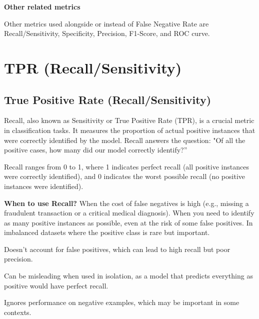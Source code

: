 \textbf{Other related metrics}

Other metrics used alongside or instead of False Negative Rate
are Recall/Sensitivity, Specificity, Precision, F1-Score, and ROC curve.

\clearpage
\section{TPR (Recall/Sensitivity)}
\subsection{True Positive Rate (Recall/Sensitivity)}
\thispagestyle{classificationstyle}

Recall, also known as Sensitivity or True Positive Rate (TPR), is a crucial metric in classification tasks. It measures the proportion of actual
positive instances that were correctly identified by the model. Recall answers the question: "Of all the positive cases, how many did our model correctly identify?”

\begin{center}
\end{center}

Recall ranges from 0 to 1, where 1 indicates perfect recall (all positive instances were correctly identified), and 0 indicates the worst
possible recall (no positive instances were identified).

\textbf{When to use Recall?}
When the cost of false negatives is high (e.g., missing a fraudulent transaction or a critical medical diagnosis).
When you need to identify as many positive instances as possible, even at the risk of some false positives. In imbalanced datasets where the positive class is rare but important.

{
\item Doesn't account for false positives, which can lead to high recall but poor precision.
\item Can be misleading when used in isolation, as a model that predicts everything as positive would have perfect recall.
\item Ignores performance on negative examples, which may be important in some contexts.
}


